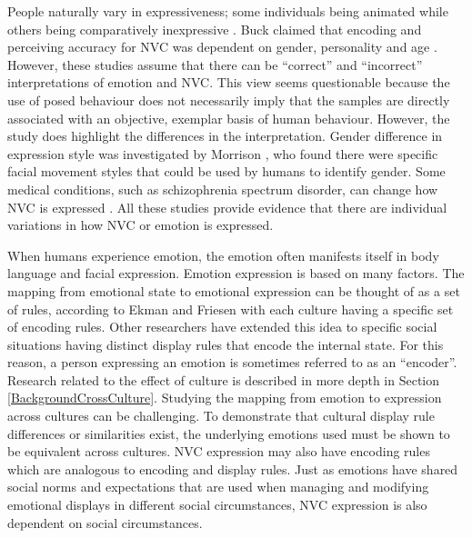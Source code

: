 People naturally vary in expressiveness; some individuals being animated while others being comparatively inexpressive \cite{Afzal2009}. Buck claimed that encoding and perceiving accuracy for \ac{NVC} was dependent on gender, personality and age \cite{Buck1979}. However, these studies assume that there can be ``correct'' and ``incorrect'' interpretations of emotion and \ac{NVC}. This view seems questionable because the use of posed behaviour does not necessarily imply that the samples are directly associated with an objective, exemplar basis of human behaviour. However, the study does highlight the differences in the interpretation. Gender difference in expression style was investigated by Morrison \etal \cite{Morrison2007}, who found there were specific facial movement styles that could be used by humans to identify gender. Some medical conditions, such as schizophrenia spectrum disorder, can change how \ac{NVC} is expressed \cite{Brune2009}. %
All these studies provide evidence that there are individual variations in how \ac{NVC} or emotion is expressed.

% 
When humans experience emotion, the emotion often manifests itself in body language and facial expression. Emotion expression is based on many factors. The mapping from emotional state to emotional expression can be thought of as a set of rules, according to Ekman and Friesen \cite{Ekman1975} with each culture having a specific set of encoding rules. Other researchers have extended this idea to specific social situations having distinct display rules \cite{Feldman1991, Brinton2007} that encode the internal state. For this reason, a person expressing an emotion is sometimes referred to as an ``encoder''.
Research related to the effect of culture is described in more depth in Section \ref{BackgroundCrossCulture}.
Studying the mapping from emotion to expression across cultures can be challenging. To demonstrate that cultural display rule differences or similarities exist, the underlying emotions used must be shown to be equivalent across cultures. \ac{NVC} expression may also have encoding rules which are analogous to encoding and display rules. %
Just as emotions have shared social norms and expectations that are used when managing and modifying emotional displays in different social circumstances, \ac{NVC} expression is also dependent on social circumstances.


